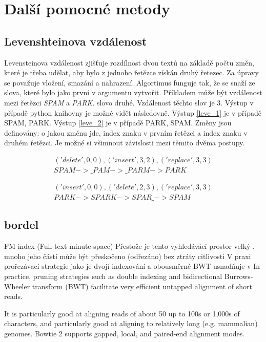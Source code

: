\documentclass[czech,DP]{thesiskiv}
\numberwithin{equation}{section}
\begin{document}
\section{Další pomocné metody}
\subsection{Levenshteinova vzdálenost}
Levensteinova vzdálenost zjišťuje rozdílnost dvou textů na základě počtu změn, které je třeba udělat, aby bylo z jednoho řetězce získán druhý řetezec. Za úpravy se považuje vložení, smazání a nahrazení. Algortimus funguje tak, že se snaží ze slova, které bylo jako první v argumentu vytvořit. Příkladem může být vzdálenost mezi řetězci \textit{SPAM} a \textit{PARK}.  slovo druhé. Vzdálenost těchto slov je 3. Výstup v případě python knihovny je možné vidět následovně. Výstup \ref{leve_1} je v případě SPAM, PARK. Výstup \ref{leve_2} je v případě PARK, SPAM. Změny jsou definovány: o jakou změnu jde, index znaku v prvním řetězci a index znaku v druhém řetězci. Je možné si všimnout závislosti mezi těmito dvěma postupy.


\begin{align}
   \label{leve_1} ('delete', 0, 0), ('insert', 3, 2), ('replace', 3, 3) \\
    SPAM -> \_PAM -> \_PARM -> PARK \nonumber
\end{align}

\begin{align}
   \label{leve_2} ('insert', 0, 0), ('delete', 2, 3), ('replace', 3, 3) \\
    PARK -> SPARK -> SPAR\_ -> SPAM \nonumber
\end{align}




\subsection{bordel}

FM index (Full-text minute-space) 
Přestože je tento vyhledávácí prostor velký , mnoho jeho částí může být přeskočeno (odřezáno) bez ztráty citlivosti
V praxi prořezávací strategie jako je dvojí indexování a obousměrné BWT usnadňuje v In practice, pruning strategies such as double indexing and bidirectional Burrows-Wheeler transform (BWT) facilitate very efficient untapped alignment of short reads.

 It is particularly good at aligning reads of about 50 up to 100s or 1,000s of characters, and particularly good at aligning to relatively long (e.g. mammalian) genomes.
  Bowtie 2 supports gapped, local, and paired-end alignment modes.
\end{document}
